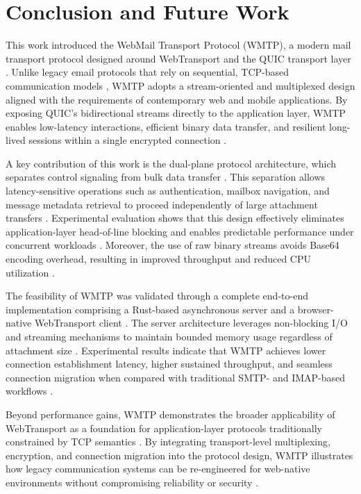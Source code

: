 \documentclass[10pt,a4paper]{article}
\begin{document}
\section{Conclusion and Future Work}

This work introduced the WebMail Transport Protocol (WMTP), a modern mail transport protocol designed around WebTransport and the QUIC transport layer \cite{smtp,quic}. Unlike legacy email protocols that rely on sequential, TCP-based communication models \cite{smtp,imap}, WMTP adopts a stream-oriented and multiplexed design aligned with the requirements of contemporary web and mobile applications. By exposing QUIC’s bidirectional streams directly to the application layer, WMTP enables low-latency interactions, efficient binary data transfer, and resilient long-lived sessions within a single encrypted connection \cite{tls13,quic}.

A key contribution of this work is the dual-plane protocol architecture, which separates control signaling from bulk data transfer \cite{jmap,webtransport}. This separation allows latency-sensitive operations such as authentication, mailbox navigation, and message metadata retrieval to proceed independently of large attachment transfers \cite{smtp,imap,base64}. Experimental evaluation shows that this design effectively eliminates application-layer head-of-line blocking and enables predictable performance under concurrent workloads \cite{quic,webtransport}. Moreover, the use of raw binary streams avoids Base64 encoding overhead, resulting in improved throughput and reduced CPU utilization \cite{base64,gridfs2024}.

The feasibility of WMTP was validated through a complete end-to-end implementation comprising a Rust-based asynchronous server \cite{rustasync,klabnik2019} and a browser-native WebTransport client \cite{webtransport}. The server architecture leverages non-blocking I/O and streaming mechanisms to maintain bounded memory usage regardless of attachment size \cite{mongodb2024,gridfs2024}. Experimental results indicate that WMTP achieves lower connection establishment latency, higher sustained throughput, and seamless connection migration when compared with traditional SMTP- and IMAP-based workflows \cite{smtp,imap,quic}.

Beyond performance gains, WMTP demonstrates the broader applicability of WebTransport as a foundation for application-layer protocols traditionally constrained by TCP semantics \cite{http3,webtransport}. By integrating transport-level multiplexing, encryption, and connection migration into the protocol design, WMTP illustrates how legacy communication systems can be re-engineered for web-native environments without compromising reliability or security \cite{tls13,quic}.
\end{document}
